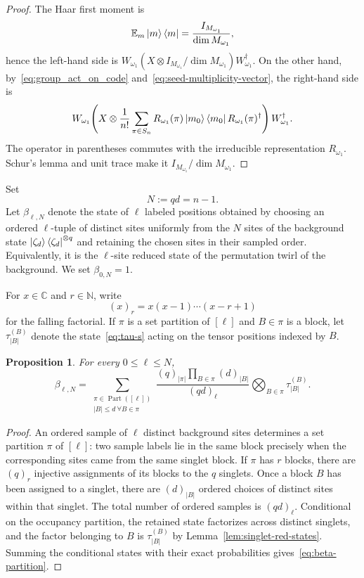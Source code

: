 \documentclass[11pt,letterpaper]{article}
\theoremstyle{plain}
\theoremstyle{plain}
\theoremstyle{plain}
\theoremstyle{plain}
\theoremstyle{plain}
\theoremstyle{plain}
\newcommand{\C}{\mathbb{C}}
\theoremstyle{plain}
\newtheorem{smproposition}[smtheorem]{Proposition}
\theoremstyle{definition}
\theoremstyle{plain}
\begin{document}
\begin{proof}
The Haar first moment is
\[
  \mathbb{E}_m\ket m\bra m=\frac{I_{M_{\omega_1}}}{\dim M_{\omega_1}},
\]
hence the left-hand side is $W_{\omega_1}(X\otimes I_{M_{\omega_1}}/\dim M_{\omega_1})W_{\omega_1}^\dagger$.  
On the other hand, by~\eqref{eq:group_act_on_code} and~\eqref{eq:seed-multiplicity-vector}, the right-hand side is
\[
  W_{\omega_1}\!\left(
    X\otimes\frac1{n!}\sum_{\pi\in S_n}
    R_{\omega_1}(\pi)\ket{m_0}\bra{m_0}R_{\omega_1}(\pi)^\dagger
  \right)W_{\omega_1}^\dagger.
\]
The operator in parentheses commutes with the irreducible representation $R_{\omega_1}$.  
Schur's lemma and unit trace make it $I_{M_{\omega_1}}/\dim M_{\omega_1}$.
\end{proof}

Set
\[
  N:=qd=n-1.
\]
Let $\beta_{\ell,N}$ denote the state of $\ell$ labeled positions obtained by choosing an ordered $\ell$-tuple of distinct sites uniformly from the $N$ sites 
of the background state $\ket{\zeta_d}\bra{\zeta_d}^{\otimes q}$ and retaining the chosen sites in their sampled order.  
Equivalently, it is the $\ell$-site reduced state of the permutation twirl of the background. We set $\beta_{0,N}=1$.

For $x\in\C$ and $r\in\mathbb N$, write
\[
  (x)_r=x(x-1)\cdots(x-r+1)
\]
for the falling factorial. If $\pi$ is a set partition of $[\ell]$ and $B\in\pi$ is a block, let $\tau_{|B|}^{(B)}$ denote the state~\eqref{eq:tau-s} acting on the tensor positions indexed by $B$.

\begin{smproposition}
\label{prop:beta-partition}
For every $0\le\ell\le N$,
\begin{equation}
\label{eq:beta-partition}
  \beta_{\ell,N}
  =
  \sum_{\substack{\pi\in\operatorname{Part}([\ell])\\ |B|\le d\ \forall B\in\pi}}
  \frac{(q)_{|\pi|}\prod_{B\in\pi}(d)_{|B|}}
       {(qd)_\ell}
  \bigotimes_{B\in\pi}\tau_{|B|}^{(B)}.
\end{equation}
\end{smproposition}

\begin{proof}
An ordered sample of $\ell$ distinct background sites determines a set partition $\pi$ of $[\ell]$: two sample labels lie in the same block precisely when the corresponding 
sites came from the same singlet block. If $\pi$ has $r$ blocks, there are $(q)_r$ injective assignments of its blocks to the $q$ singlets. 
Once a block $B$ has been assigned to a singlet, there are $(d)_{|B|}$ ordered choices of distinct sites within that singlet.  
The total number of ordered samples is $(qd)_\ell$. Conditional on the occupancy partition, the retained state factorizes across distinct singlets, and the factor belonging to $B$ is $\tau_{|B|}^{(B)}$ by 
Lemma~\ref{lem:singlet-red-states}. Summing the conditional states with their exact probabilities gives~\eqref{eq:beta-partition}.
\end{proof}
\end{document}
